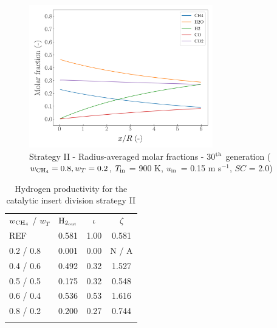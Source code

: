 \documentclass[preprint,12pt]{elsarticle}
\begin{document}
\begin{figure}[h!]
\centering
\includegraphics[width=80mm]{results/5Eq/80C_20T/GEN30-AVG.png}
\caption{\label{fig:5RES8020G30-avg} Strategy II - Radius-averaged molar fractions -  30$^{\rm{th}}$ generation ($w_{\rm{CH_4}} = 0.8, w_T = 0.2$, $T_{\rm{in}}$ = 900 K, $u_{\rm{in}}$ = 0.15 m s$^{-1}$, $SC$ = 2.0)}
\end{figure}



\begin{center}
\begin{table}
\centering
\caption{Hydrogen productivity for the catalytic insert division strategy II}
\label{tab:5RH2prod}
\begin{tabular}{l|c|c|c}
\hline\noalign{\smallskip}
 $w_{\rm{CH_4}}$ / $ w_T $ & $\rm{H_{2_{out}}}$ & $\iota$ & $\zeta$ \\
\noalign{\smallskip}\hline\noalign{\smallskip}
REF         & 0.581     & 1.00  &  0.581\\
0.2 / 0.8   & 0.001     & 0.00  & N / A \\
0.4 / 0.6   & 0.492     & 0.32  & 1.527 \\
0.5 / 0.5   & 0.175     & 0.32  & 0.548 \\
0.6 / 0.4   & 0.536     & 0.53  & 1.616 \\
0.8 / 0.2   & 0.200     & 0.27  & 0.744 \\
\noalign{\smallskip}\hline
\end{tabular}
\end{table}
\end{center}
\end{document}
